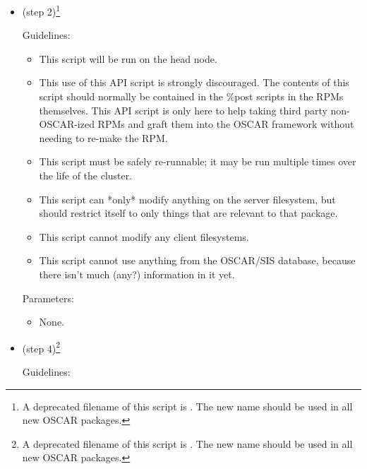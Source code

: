 \begin{itemize}
\item {} (step 2)\footnote{A deprecated
    filename of this script is .  The
    new name  should be used in all
    new OSCAR packages.}
  
  Guidelines:

  \begin{itemize}
  \item This script will be run on the head node.
  \item This use of this API script is strongly discouraged.  The
    contents of this script should normally be contained in the \%post
    scripts in the RPMs themselves.  This API script is only here to
    help taking third party non-OSCAR-ized RPMs and graft them into
    the OSCAR framework without needing to re-make the RPM.
  \item This script must be safely re-runnable; it may be run multiple
    times over the life of the cluster.
  \item This script can *only* modify anything on the server
    filesystem, but should restrict itself to only things that are
    relevant to that package.
  \item This script cannot modify any client filesystems.
  \item This script cannot use anything from the OSCAR/SIS database,
    because there isn't much (any?) information in it yet.
  \end{itemize}

  Parameters:
  
  \begin{itemize}
  \item None.
  \end{itemize}
  
\item {} (step 4)\footnote{A deprecated
    filename of this script is .  The new
    name  should be used in all new
    OSCAR packages.}  
  
  Guidelines:


\end{itemize}
